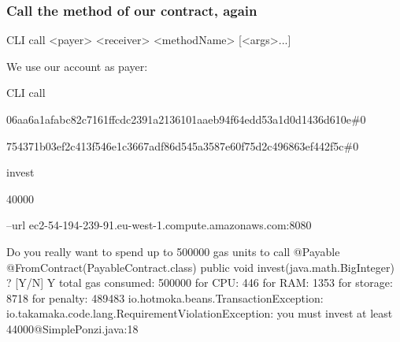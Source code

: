 \documentclass[11pt]{beamer}  %
\def\codesize{\smaller}
\def\<#1>{\codeid{#1}}
\newcommand{\codeid}[1]{\ifmmode{\mbox{\codesize\ttfamily{#1}}}\else{\codesize\ttfamily #1}\fi}
\begin{document}
\begin{frame}[fragile]\frametitle{Call the \<invest> method of our contract, again}

\begin{tt}
CLI call <payer> <receiver> <methodName> [<args>...]
\end{tt}

\medskip

We use our account as payer:

\medskip

\begin{greenbox}{}
 {\color{armygreen}\scriptsize{\begin{tt}
          CLI call

          06aa6a1afabc82c7161ffcdc2391a2136101aaeb94f64edd53a1d0d1436d610e\#0

          754371b03ef2c413f546e1c3667adf86d545a3587e60f75d2c496863ef442f5c\#0

          invest

          40000

          --url ec2-54-194-239-91.eu-west-1.compute.amazonaws.com:8080
 \end{tt}}}
    {\tiny\begin{semiverbatim}
Do you really want to spend up to 500000 gas units to call
  {\color{red}@Payable @FromContract(PayableContract.class) public void invest(java.math.BigInteger)} ? [Y/N] Y
{\color{armygreen}total gas consumed: 500000}
{\color{darkred}  for CPU: 446
  for RAM: 1353
  for storage: 8718
  for penalty: 489483}
{\color{red}io.hotmoka.beans.TransactionException: io.takamaka.code.lang.RequirementViolationException:
  you must invest at least 44000@SimplePonzi.java:18}
\end{semiverbatim}}
\end{greenbox}

\end{frame}
\end{document}
